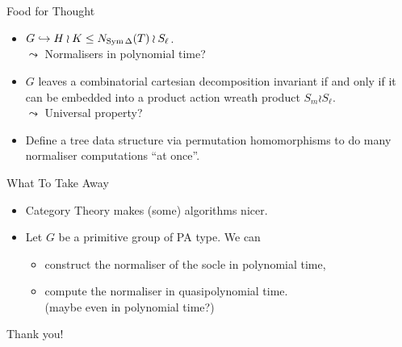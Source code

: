 \begin{frame}{Food for Thought}
    \begin{itemize}
        \setlength\itemsep{2em}
        \item
        $G \hookrightarrow H \wr K \leq N_{\operatorname{Sym} \Delta}(T) \wr S_ \ell$.
        \\
        $\leadsto$ Normalisers in polynomial time?
        \pause
        \item
        $G$ leaves a combinatorial cartesian decomposition invariant
        if and only if it can be embedded into a product action wreath product
        $S_m \wr S_\ell$.
        \\
        $\leadsto$ Universal property?
        \pause
        \item
        Define a tree data structure via permutation homomorphisms to do many
        normaliser computations ``at once''.
    \end{itemize}
\end{frame}

\begin{frame}{What To Take Away}
    \begin{itemize}
        \setlength\itemsep{2em}
        \item
        Category Theory makes (some) algorithms nicer.
        \pause
        \item
        Let $G$ be a primitive group of PA type. We can
        \pause
        \begin{itemize}
            \item
            construct the normaliser of the socle in polynomial time,
            \pause
            \item
            compute the normaliser in quasipolynomial time.
            \\
            \pause
            (maybe even in polynomial time?)
        \end{itemize}
    \end{itemize}
\end{frame}

\begin{frame}
    \centering
    \Large
    Thank you!
\end{frame}
